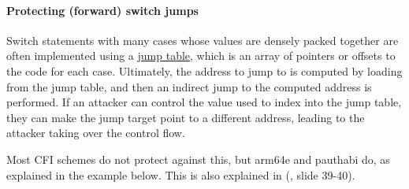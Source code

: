 \documentclass[
  a4paper,
]{report}
\begin{document}
\paragraph{Protecting (forward) switch
jumps}\label{protecting-forward-switch-jumps}

Switch statements with many cases whose values are densely packed
together are often implemented using a
\href{https://en.wikipedia.org/wiki/Branch_table}{jump
table}, which is an array of pointers or offsets to
the code for each case. Ultimately, the address to jump to is computed
by loading from the jump table, and then an indirect jump to the
computed address is performed. If an attacker can control the value used
to index into the jump table, they can make the jump target point to a
different address, leading to the attacker taking over the control flow.

Most CFI schemes do not protect against this, but arm64e
and pauthabi do, as explained in the example below. This
is also explained in (, slide 39-40).
\end{document}
